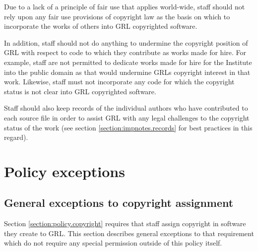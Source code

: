 \documentclass[10pt,a4paper]{article}
\begin{document}
\par Due to a lack of a principle of fair use that applies world-wide, staff should not 
rely upon any fair use provisions of copyright law as the basis on which to 
incorporate the works of others into GRL copyrighted software. 

\par In addition, staff should not do anything to undermine the copyright position of GRL 
with respect to code to which they contribute as works made for hire. For example, 
staff are not permitted to dedicate works made for hire for the Institute into the 
public domain as that would undermine GRLs copyright interest in that work. 
Likewise, staff must not incorporate any code for which the copyright status is 
not clear into GRL copyrighted software. 

\par Staff should also keep records of the individual authors who have contributed to 
each source file in order to assist GRL with any legal challenges to the copyright 
status of the work (see section \ref{section:impnotes.records} for best practices in this regard). 




\section{Policy exceptions}
\label{section:exceptions}

\subsection{General exceptions to copyright assignment}
\label{section:exceptions.general}
Section \ref{section:policy.copyright} requires that staff assign copyright in 
software they create to GRL. This section describes general exceptions to 
that requirement which do not require any special permission outside of this 
policy itself. 
\end{document}
